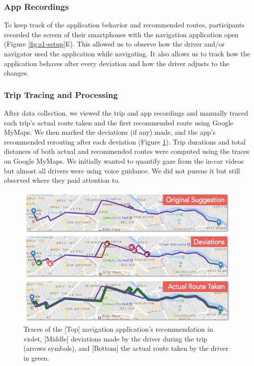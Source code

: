 \subsubsection{App Recordings}
To keep track of the application behavior and recommended routes, participants recorded the screen of their smartphones with the navigation application open (Figure \ref{fig:s1-setup}E). This allowed us to observe how the driver and/or navigator used the application while navigating. It also allows us to track how the application behaves after every deviation and how the driver adjusts to the changes.

\subsubsection{Trip Tracing and Processing}
After data collection, we viewed the trip and app recordings and manually traced each trip's actual route taken and the first recommended route using Google MyMaps. We then marked the deviations (if any) made, and the app's recommended rerouting after each deviation (Figure \ref{fig:s1-map-trace}). Trip durations and total distances of both actual and recommended routes were computed using the traces on Google MyMaps. We initially wanted to quantify gaze from the in-car videos but almost all drivers were using voice guidance. We did not pursue it but still observed where they paid attention to. 

\begin{figure}[t]
  \centering
  \includegraphics{figures/s1-map-tracing.png}
  \caption{Traces of the [Top] navigation application's recommendation in violet, [Middle] deviations made by the driver during the trip (arrows symbols), and [Bottom] the actual route taken by the driver in green.}
  \label{fig:s1-map-trace}
\end{figure}

